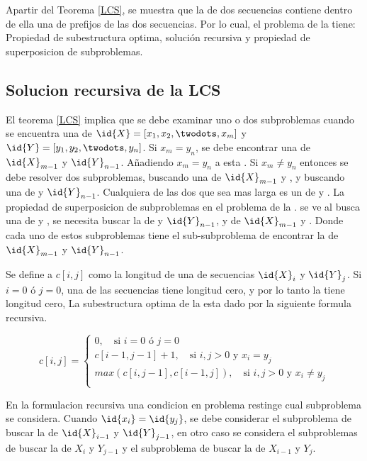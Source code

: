 Apartir del Teorema \ref{LCS}, se muestra que la  de dos secuencias contiene dentro de ella una  de prefijos de las dos secuencias. Por lo cual, el problema de la  tiene: Propiedad de subestructura optima, solución recursiva y propiedad de superposicion de subproblemas.

\subsection{Solucion recursiva de la LCS}
El teorema \ref{LCS} implica que se debe examinar uno o dos subproblemas cuando se encuentra una  de $\id{X} = [x_1,x_2,\twodots,x_m]$ y $\id{Y} = [y_1,y_2,\twodots,y_n]$. Si $x_m = y_n$, se debe encontrar una  de $\id{X}_{m-1}$ y $\id{Y}_{n-1}$. Añadiendo $x_m = y_n$ a esta . Si $x_m \neq y_n$ entonces se debe resolver dos subproblemas, buscando una  de $\id{X}_{m-1}$ y , y buscando una  de  y $\id{Y}_{n-1}$. Cualquiera de las dos  que sea mas larga es un  de  y .
La propiedad de superposicion de subproblemas en el problema de la . se ve al busca una  de  y , se necesita buscar la  de  y $\id{Y}_{n-1}$, y de $\id{X}_{m-1}$ y . Donde cada uno de estos subproblemas tiene el sub-subproblema de encontrar la  de $\id{X}_{m-1}$ y $\id{Y}_{n-1}$.

Se define a $c[i, j]$ como la longitud de una  de secuencias $\id{X}_{i}$ y $\id{Y}_{j}$. Si $i=0$ ó $j=0$, una de las secuencias tiene longitud cero, y por lo tanto la  tiene longitud cero, La subestructura optima de la  esta dado por la siguiente formula recursiva.

\begin{equation}
\label{eq_lcs}
c[i,j] =
     \begin{cases}
       0, \quad \text{si } i = 0 \text{ ó } j = 0\\
       c[i-1,j-1]+1, \quad \text{si } i,j > 0 \text{ y } x_i = y_j \\
       max(c[i,j-1],c[i-1,j]), \quad \text{si } i,j > 0 \text{ y } x_i \neq y_j\\
     \end{cases}
\end{equation}

En la formulacion recursiva una condicion en problema restinge cual subproblema se considera. Cuando $\id{x_i} = \id{y_j}$, se debe considerar el subproblema de buscar la  de $\id{X}_{i-1}$ y $\id{Y}_{j-1}$, en otro caso se considera el subproblemas de buscar la  de $X_i$ y $Y_{j-1}$ y el subproblema de buscar la  de $X_{i-1}$ y $Y_j$.

